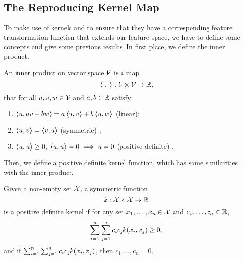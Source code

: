 
\subsection{The Reproducing Kernel Map} %
To make use of kernels and to ensure that they have a corresponding feature transformation function that extends our feature space, we have to define some concepts and give some previous results.
In first place, we define the inner product.
%
\begin{definition}
    An inner product on vector space $\mathcal{V}$ is a map
    $$\bm{\left\langle} \cdot, \cdot \bm{\right\rangle}: \mathcal{V} \times \mathcal{V} \to \mathbb{R} , $$
    that for all $u, v, w \in \mathcal{V}$ and $a, b \in \mathbb{R}$ satisfy:
    \begin{enumerate}
        \item $\bm{\left\langle} u, a v + b w \bm{\right\rangle} = a\bm{\left\langle} u, v \bm{\right\rangle} + b\bm{\left\langle} u, w \bm{\right\rangle}$ (linear);
        \item $\bm{\left\langle} u, v \bm{\right\rangle} = \bm{\left\langle} v, u \bm{\right\rangle}$ (symmetric) ;
        \item $\bm{\left\langle} u, u \bm{\right\rangle} \geq 0, \; \bm{\left\langle} u, u \bm{\right\rangle} = 0 \implies u = 0$ (positive definite) .
    \end{enumerate} 
\end{definition}
%
Then, we define a positive definite kernel function, which has some similarities with the inner product.
\begin{definition}
    Given a non-empty set $\mathcal{X}$, a symmetric function
    \begin{equation}
        \nonumber
        k: \mathcal{X} \times \mathcal{X} \to \mathbb{R}
    \end{equation}
    is a positive definite kernel if for any set $x_1, \ldots, x_n \in \mathcal{X}$ and $c_1, \ldots, c_n \in \mathbb{R}$,
    \begin{equation}
        \nonumber
        \sum_{i=1}^n \sum_{j=1}^n c_i c_j k(x_i, x_j) \geq 0 ,
    \end{equation} 
    and if $\sum_{i=1}^n \sum_{j=1}^n c_i c_j k(x_i, x_j)$, then $c_1, \ldots, c_n = 0$.
\end{definition}
